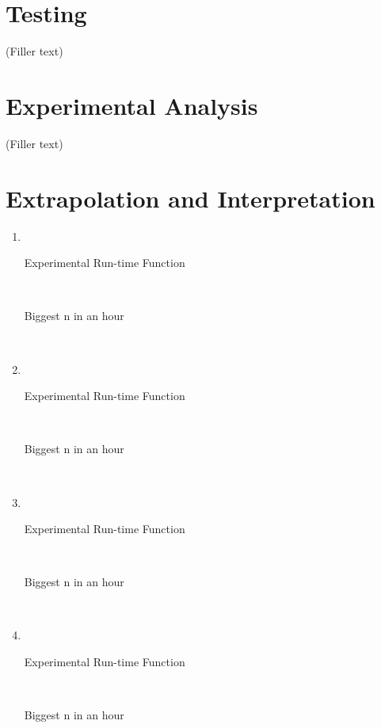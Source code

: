 \documentclass[paper=a4, fontsize=11pt]{scrartcl} %
\numberwithin{equation}{section} %
\numberwithin{figure}{section} %
\numberwithin{table}{section} %
\begin{document}
\section{Testing}
(Filler text)

\section{Experimental Analysis}
(Filler text)

\section{Extrapolation and Interpretation}
\begin{enumerate}[label=\bfseries Algorithm \arabic*:]
    \item \hfill \\
    \begin{description}
        \item[Experimental Run-time Function] \hfill \\
        \item[Biggest n in an hour] \hfill \\
    \end{description}

    \item \hfill \\
    \begin{description}
        \item[Experimental Run-time Function] \hfill \\
        \item[Biggest n in an hour] \hfill \\
    \end{description}

    \item \hfill \\
    \begin{description}
        \item[Experimental Run-time Function] \hfill \\
        \item[Biggest n in an hour] \hfill \\
    \end{description}

    \item \hfill \\
    \begin{description}
        \item[Experimental Run-time Function] \hfill \\
        \item[Biggest n in an hour] \hfill \\
    \end{description}
\end{enumerate}
\end{document}
